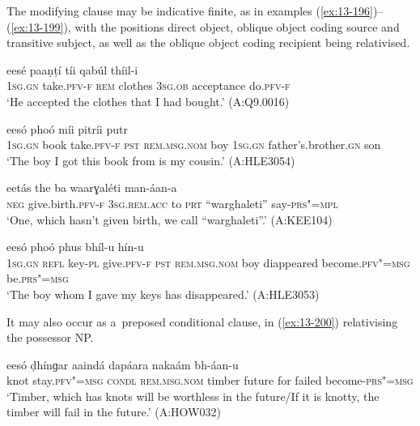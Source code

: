 The modifying clause may be indicative finite, as in examples (\ref{ex:13-196})--(\ref{ex:13-199}), with the positions direct object, oblique object coding source and transitive subject, as well as the oblique object coding recipient being relativised.

\begin{exe}
\ex
\label{ex:13-196}
 eesé paaṇṭí tíi qabúl  thíil-i \\
\textsc{1sg.gn} take.\textsc{pfv-f} \textsc{rem} clothes \textsc{3sg.ob} acceptance do.\textsc{pfv-f} \\
\glt `He accepted the clothes that I had bought.' (A:Q9.0016)

\ex
\label{ex:13-197}
 eesó phoó  míi pitríi putr \\
\textsc{1sg.gn} book take.\textsc{pfv-f} \textsc{pst} \textsc{rem.msg.nom} boy  \textsc{1sg.gn} father's.brother.\textsc{gn} son \\
\glt `The boy I got this book from is my cousin.' (A:HLE3054)

\ex
\label{ex:13-198}
\gll [na ǰéel-i] eetás the ba  waarɣaléti man-áan-a \\
\textsc{neg} give.birth.\textsc{pfv-f} \textsc{3sg.rem.acc} to \textsc{prt}  ``warghaleti'' say-\textsc{prs"=mpl} \\
\glt `One, which hasn't given birth, we call ``warghaleti''.' (A:KEE104)

\ex
\label{ex:13-199}
 eesó  phoó phus bhíl-u hín-u  \\
\textsc{1sg.gn} \textsc{refl} key-\textsc{pl} give.\textsc{pfv-f} \textsc{pst} \textsc{rem.msg.nom}  boy diappeared become.\textsc{pfv"=msg} be.\textsc{prs"=msg} \\
\glt `The boy whom I gave my keys has disappeared.' (A:HLE3053) 
\end{exe}

It may also occur as a~preposed conditional clause, in (\ref{ex:13-200}) relativising the possessor NP.

\begin{exe}
\ex
\label{ex:13-200}
 eesó ḍhínɡar aaindá  dapáara nakaám bh-áan-u  \\
knot stay.\textsc{pfv"=msg} \textsc{condl} \textsc{rem.msg.nom} timber future  for failed become-\textsc{prs"=msg} \\
\glt `Timber, which has knots will be worthless in the future/If it is knotty, the timber will fail in the future.' (A:HOW032) 
\end{exe}

